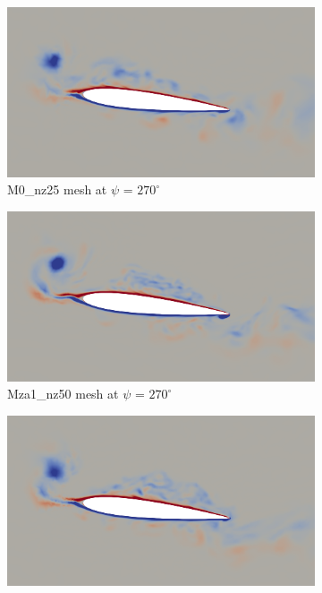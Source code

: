 \begin{figure}[H]
\centering

\begin{subfigure}[b]{0.475\textwidth}
\centering
\includegraphics[width=1\textwidth]{figures/adapt_strat/vorticity_plots/M0/phase_270.png}
\caption{M0\_nz25 mesh at $\psi$ = $270^\circ$}
\label{fig:M0_psi270}
\end{subfigure}
\begin{subfigure}[b]{0.475\textwidth}
\centering
\includegraphics[width=1\textwidth]{figures/adapt_strat/vorticity_plots/Mza1_50/phase_270.png}
\caption{Mza1\_nz50 mesh at $\psi$ = $270^\circ$}
\label{fig:Ma1_psi270}
\end{subfigure}
\begin{subfigure}[b]{0.475\textwidth}
\centering
\includegraphics[width=1\textwidth]{figures/adapt_strat/vorticity_plots/Msa1_50/phase_270.png}

\end{subfigure}
\end{figure}

